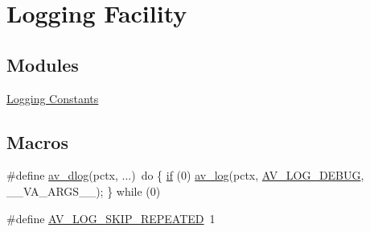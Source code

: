 \hypertarget{group__lavu__log}{}\section{Logging Facility}
\label{group__lavu__log}
\subsection*{Modules}
\begin{DoxyCompactItemize}
\item 
\hyperlink{group__lavu__log__constants}{Logging Constants}
\end{DoxyCompactItemize}
\subsection*{Macros}
\begin{DoxyCompactItemize}
\item 
\#define \hyperlink{group__lavu__log_ga793c07676246a541ca1cb910df880cdd}{av\+\_\+dlog}(pctx, ...)~do \{ \hyperlink{sndfile__save_8m_a55944e1fa1bcc1bfc6185bc610b0a930}{if} (0) \hyperlink{group__lavu__log_gabd386ffd4b27637cf34e98d5d1a6e8ae}{av\+\_\+log}(pctx, \hyperlink{group__lavu__log__constants_ga5b7221c3afd06848486776bd834a58a5}{A\+V\+\_\+\+L\+O\+G\+\_\+\+D\+E\+B\+UG}, \+\_\+\+\_\+\+V\+A\+\_\+\+A\+R\+G\+S\+\_\+\+\_\+); \} while (0)
\item 
\#define \hyperlink{group__lavu__log_ga6cdf5cd331b17e80e8308124f05a6db8}{A\+V\+\_\+\+L\+O\+G\+\_\+\+S\+K\+I\+P\+\_\+\+R\+E\+P\+E\+A\+T\+ED}~1
\end{DoxyCompactItemize}

